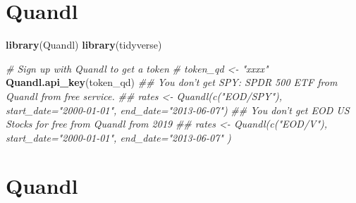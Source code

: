 \documentclass[]{article}
\newenvironment{Shaded}{\begin{snugshade}}{\end{snugshade}}
\newcommand{\CommentTok}[1]{\textcolor[rgb]{0.56,0.35,0.01}{\textit{#1}}}
\newcommand{\KeywordTok}[1]{\textcolor[rgb]{0.13,0.29,0.53}{\textbf{#1}}}
\newcommand{\NormalTok}[1]{#1}
\begin{document}
\hypertarget{quandl}{%
\section{Quandl}\label{quandl}}

\begin{Shaded}
\begin{Highlighting}[]
\KeywordTok{library}\NormalTok{(Quandl)}
\KeywordTok{library}\NormalTok{(tidyverse)}

\CommentTok{# Sign up with Quandl to get a token}
\CommentTok{# token_qd <- "xxxx"}
\KeywordTok{Quandl.api_key}\NormalTok{(token_qd)}
\CommentTok{## You don't get SPY: SPDR 500 ETF from Quandl from free service.}
\CommentTok{## rates <- Quandl(c("EOD/SPY"), start_date="2000-01-01", end_date="2013-06-07")}
\CommentTok{## You don't get EOD US Stocks for free from Quandl from 2019}
\CommentTok{## rates <- Quandl(c("EOD/V"), start_date="2000-01-01", end_date="2013-06-07" )}
\end{Highlighting}
\end{Shaded}

\hypertarget{quandl-1}{%
\section{Quandl}\label{quandl-1}}
\end{document}
